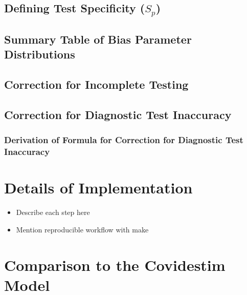 \documentclass[12pt,twoside]{smiththesis}
\providecommand{\tightlist}{%
  \setlength{\itemsep}{0pt}\setlength{\parskip}{0pt}}
\begin{document}
\hypertarget{defining-test-specificity-s_p}{%
\section{\texorpdfstring{Defining Test Specificity (\(S_p\))}{Defining Test Specificity (S\_p)}}\label{defining-test-specificity-s_p}}

\hypertarget{summary-table-of-bias-parameter-distributions}{%
\section{Summary Table of Bias Parameter Distributions}\label{summary-table-of-bias-parameter-distributions}}

\hypertarget{correction-for-incomplete-testing}{%
\section{Correction for Incomplete Testing}\label{correction-for-incomplete-testing}}

\hypertarget{correction-for-diagnostic-test-inaccuracy}{%
\section{Correction for Diagnostic Test Inaccuracy}\label{correction-for-diagnostic-test-inaccuracy}}

\hypertarget{derivation-of-formula-for-correction-for-diagnostic-test-inaccuracy}{%
\subsection{Derivation of Formula for Correction for Diagnostic Test Inaccuracy}\label{derivation-of-formula-for-correction-for-diagnostic-test-inaccuracy}}

\hypertarget{details-of-implementation}{%
\chapter{Details of Implementation}\label{details-of-implementation}}
\begin{itemize}
\tightlist
\item
  Describe each step here
\item
  Mention reproducible workflow with make
\end{itemize}
\hypertarget{comparison-to-the-covidestim-model}{%
\chapter{Comparison to the Covidestim Model}\label{comparison-to-the-covidestim-model}}
\end{document}
